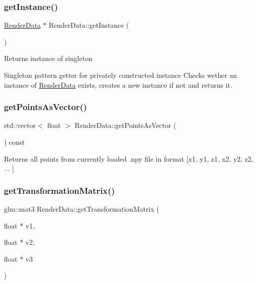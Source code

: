 \subsubsection{\texorpdfstring{get\+Instance()}{getInstance()}}
{\footnotesize\ttfamily \hyperlink{class_render_data}{Render\+Data} $\ast$ Render\+Data\+::get\+Instance (\begin{DoxyParamCaption}{ }\end{DoxyParamCaption})\hspace{0.3cm}{\ttfamily [static]}}

\begin{DoxyReturn}{Returns}
instance of singleton
\end{DoxyReturn}
Singleton pattern getter for privately constructed instance Checks wether an instance of \hyperlink{class_render_data}{Render\+Data} exists, creates a new instance if not and returns it. \mbox{\label{class_render_data_a24e60dcccd94c47c02e0e47f2ca7b5c2}} 
\subsubsection{\texorpdfstring{get\+Points\+As\+Vector()}{getPointsAsVector()}}
{\footnotesize\ttfamily std\+::vector$<$ float $>$ Render\+Data\+::get\+Points\+As\+Vector (\begin{DoxyParamCaption}{ }\end{DoxyParamCaption}) const}

\begin{DoxyReturn}{Returns}
all points from currently loaded .npy file in format \mbox{[}x1, y1, z1, x2, y2, z2, ... \mbox{]} 
\end{DoxyReturn}
\mbox{\label{class_render_data_afbc604f853739d0198c9da5097987fa7}} 
\subsubsection{\texorpdfstring{get\+Transformation\+Matrix()}{getTransformationMatrix()}}
{\footnotesize\ttfamily glm\+::mat3 Render\+Data\+::get\+Transformation\+Matrix (\begin{DoxyParamCaption}\item[{float $\ast$}]{v1,  }\item[{float $\ast$}]{v2,  }\item[{float $\ast$}]{v3 }\end{DoxyParamCaption})\hspace{0.3cm}{\ttfamily [private]}}

